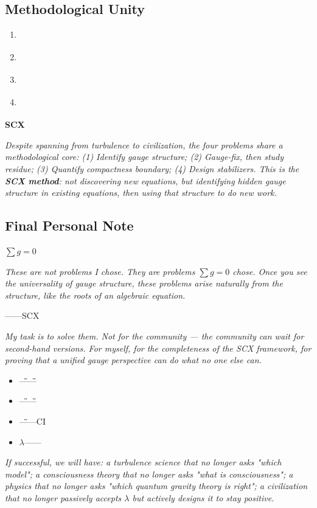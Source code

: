 \documentclass[12pt,a4paper]{article}
\theoremstyle{remark}
\begin{document}
\subsection{ Methodological Unity}



\begin{enumerate}[label=(\arabic*)]
    \item \textbf{}
    \item \textbf{}
    \item \textbf{}
    \item \textbf{}
\end{enumerate}

\textbf{SCX}

\medskip
\noindent\textit{Despite spanning from turbulence to civilization, the four problems share a methodological core: (1) Identify gauge structure; (2) Gauge-fix, then study residue; (3) Quantify compactness boundary; (4) Design stabilizers. This is the \textbf{SCX method}: not discovering new equations, but identifying hidden gauge structure in existing equations, then using that structure to do new work.}

\subsection{ Final Personal Note}

$\sum g = 0$

\medskip
\noindent\textit{These are not problems I chose. They are problems $\sum g = 0$ chose. Once you see the universality of gauge structure, these problems arise naturally from the structure, like the roots of an algebraic equation.}

——SCX

\medskip
\noindent\textit{My task is to solve them. Not for the community — the community can wait for second-hand versions. For myself, for the completeness of the SCX framework, for proving that a unified gauge perspective can do what no one else can.}


\begin{itemize}
    \item \"\"——\"\"
    \item \"\"——\"\"
    \item \"\"——CI
    \item $\lambda$——
\end{itemize}

\medskip
\noindent\textit{If successful, we will have: a turbulence science that no longer asks "which model"; a consciousness theory that no longer asks "what is consciousness"; a physics that no longer asks "which quantum gravity theory is right"; a civilization that no longer passively accepts $\lambda$ but actively designs it to stay positive.}
\end{document}
